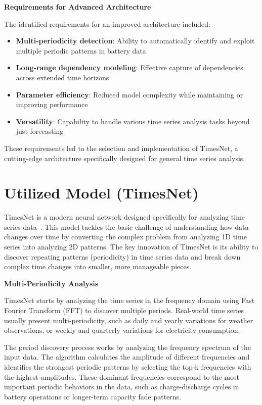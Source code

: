 \textbf{Requirements for Advanced Architecture}

The identified requirements for an improved architecture included:

\begin{itemize}
    \item \textbf{Multi-periodicity detection}: Ability to automatically identify and exploit multiple periodic patterns in battery data
    \item \textbf{Long-range dependency modeling}: Effective capture of dependencies across extended time horizons
    \item \textbf{Parameter efficiency}: Reduced model complexity while maintaining or improving performance
    \item \textbf{Versatility}: Capability to handle various time series analysis tasks beyond just forecasting
\end{itemize}

These requirements led to the selection and implementation of TimesNet, a cutting-edge architecture specifically designed for general time series analysis.

\section{Utilized Model (TimesNet)}
\label{sec:timesnet_model}

TimesNet is a modern neural network designed specifically for analyzing time series data~\cite{wu_timesnet_2023}. This model tackles the basic challenge of understanding how data changes over time by converting the complex problem from analyzing 1D time series into analyzing 2D patterns. The key innovation of TimesNet is its ability to discover repeating patterns (periodicity) in time series data and break down complex time changes into smaller, more manageable pieces.

\textbf{Multi-Periodicity Analysis}

TimesNet starts by analyzing the time series in the frequency domain using Fast Fourier Transform (FFT) to discover multiple periods. Real-world time series usually present multi-periodicity, such as daily and yearly variations for weather observations, or weekly and quarterly variations for electricity consumption. 

The period discovery process works by analyzing the frequency spectrum of the input data. The algorithm calculates the amplitude of different frequencies and identifies the strongest periodic patterns by selecting the top-k frequencies with the highest amplitudes. These dominant frequencies correspond to the most important periodic behaviors in the data, such as charge-discharge cycles in battery operations or longer-term capacity fade patterns.

